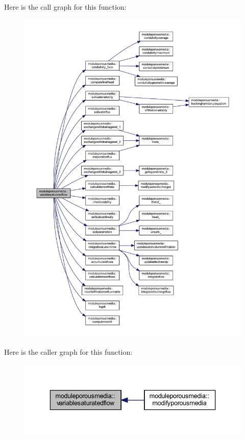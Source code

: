 Here is the call graph for this function\+:\nopagebreak
\begin{figure}[H]
\begin{center}
\leavevmode
\includegraphics[width=350pt]{namespacemoduleporousmedia_a616ff2e8e3230ac9ca5923369b4d8cfc_cgraph}
\end{center}
\end{figure}
Here is the caller graph for this function\+:\nopagebreak
\begin{figure}[H]
\begin{center}
\leavevmode
\includegraphics[width=336pt]{namespacemoduleporousmedia_a616ff2e8e3230ac9ca5923369b4d8cfc_icgraph}
\end{center}
\end{figure}
\mbox{\label{namespacemoduleporousmedia_a406def0f9f49282ca709c13afe389dff}} 
